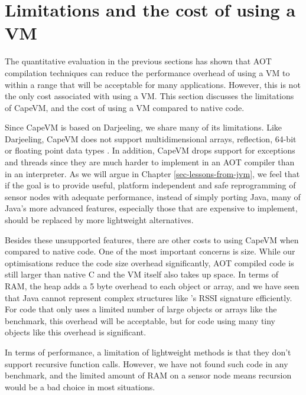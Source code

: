 \section{Limitations and the cost of using a VM}
\label{sec-evaluation-limitations}
The quantitative evaluation in the previous sections has shown that AOT compilation techniques can reduce the performance overhead of using a VM to within a range that will be acceptable for many applications. However, this is not the only cost associated with using a VM. This section discusses the limitations of CapeVM, and the cost of using a VM compared to native code.

Since CapeVM is based on Darjeeling, we share many of its limitations. Like Darjeeling, CapeVM does not support multidimensional arrays, reflection, 64-bit or floating point data types \cite{Brouwers:2009cj}. In addition, CapeVM drops support for exceptions and threads since they are much harder to implement in an AOT compiler than in an interpreter. As we will argue in Chapter \ref{sec-lessons-from-jvm}, we feel that if the goal is to provide useful, platform independent and safe reprogramming of sensor nodes with adequate performance, instead of simply porting Java, many of Java's more advanced features, especially those that are expensive to implement, should be replaced by more lightweight alternatives.

Besides these unsupported features, there are other costs to using CapeVM when compared to native code. One of the most important concerns is size. While our optimisations reduce the code size overhead significantly, AOT compiled code is still larger than native C and the VM itself also takes up space. In terms of RAM, the heap adds a 5 byte overhead to each object or array, and we have seen that Java cannot represent complex structures like 's RSSI signature efficiently. For code that only uses a limited number of large objects or arrays like the  benchmark, this overhead will be acceptable, but for code using many tiny objects like  this overhead is significant.

In terms of performance, a limitation of lightweight methods is that they don't support recursive function calls. However, we have not found such code in any benchmark, and the limited amount of RAM on a sensor node means recursion would be a bad choice in most situations.

